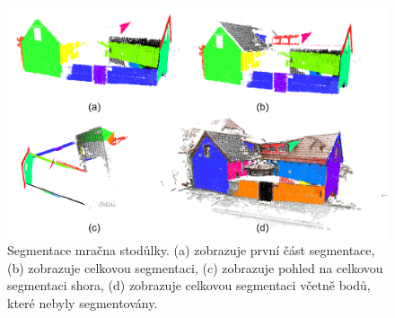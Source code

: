 \documentclass[11pt,twoside,a4paper]{book}
\begin{document}
\begin{figure}[H]
\begin{center}
\includegraphics[width=\textwidth]{figures/test-st}
\caption{Segmentace mračna stodůlky. (a) zobrazuje první část segmentace, (b) zobrazuje celkovou segmentaci, (c) zobrazuje pohled na celkovou segmentaci shora, (d) zobrazuje celkovou segmentaci včetně bodů, které nebyly segmentovány.}
\label{fig:test-st}
\end{center}
\end{figure}
\end{document}
